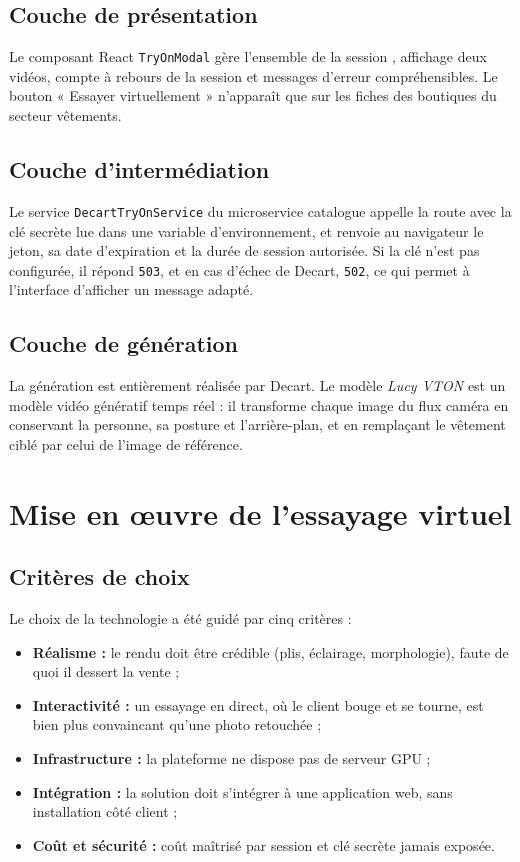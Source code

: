 \subsection{Couche de présentation}
Le composant React \texttt{TryOnModal} gère l'ensemble de la session , affichage deux vidéos, compte à rebours de la session et messages d'erreur compréhensibles. Le bouton « Essayer virtuellement » n'apparaît que sur les fiches des boutiques du secteur vêtements.

\subsection{Couche d'intermédiation}
Le service \texttt{DecartTryOnService} du microservice catalogue appelle la route avec la clé secrète lue dans une variable d'environnement, et renvoie au navigateur le jeton, sa date d'expiration et la durée de session autorisée. Si la clé n'est pas configurée, il répond \texttt{503}, et en cas d'échec de Decart, \texttt{502}, ce qui permet à l'interface d'afficher un message adapté.

\subsection{Couche de génération}
La génération est entièrement réalisée par Decart. Le modèle \textit{Lucy VTON} est un modèle vidéo génératif temps réel : il transforme chaque image du flux caméra en conservant la personne, sa posture et l'arrière-plan, et en remplaçant le vêtement ciblé par celui de l'image de référence.

\section{Mise en œuvre de l'essayage virtuel}
\subsection{Critères de choix}
Le choix de la technologie a été guidé par cinq critères :
\begin{itemize}
  \item \textbf{Réalisme :} le rendu doit être crédible (plis, éclairage, morphologie), faute de quoi il dessert la vente ;
  \item \textbf{Interactivité :} un essayage en direct, où le client bouge et se tourne, est bien plus convaincant qu'une photo retouchée ;
  \item \textbf{Infrastructure :} la plateforme ne dispose pas de serveur GPU ;
  \item \textbf{Intégration :} la solution doit s'intégrer à une application web, sans installation côté client ;
  \item \textbf{Coût et sécurité :} coût maîtrisé par session et clé secrète jamais exposée.
\end{itemize}

